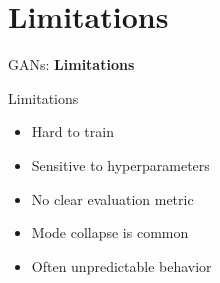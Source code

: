 \section{Limitations}

\begin{frame}{}
    \LARGE GANs: \textbf{Limitations}
\end{frame}

\begin{frame}{Limitations}
    \begin{itemize}
        \item Hard to train
        \item Sensitive to hyperparameters
        \item No clear evaluation metric
        \item Mode collapse is common
        \item Often unpredictable behavior
    \end{itemize}
\end{frame}